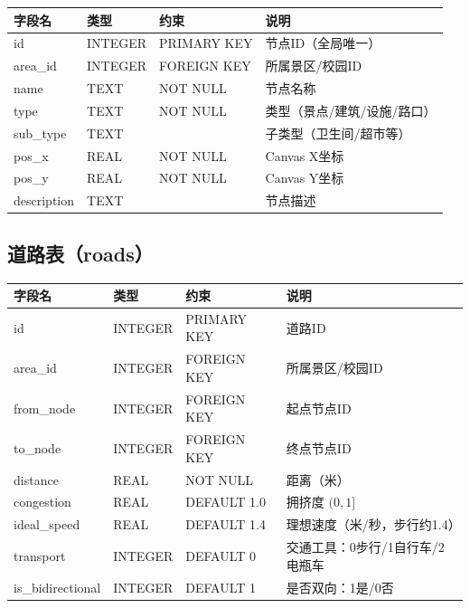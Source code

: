 \documentclass[12pt,a4paper]{report}
\begin{document}
\begin{table}[H]
\centering
\small
\begin{tabular}{llll}
\toprule
\textbf{字段名} & \textbf{类型} & \textbf{约束} & \textbf{说明} \\
\midrule
id & INTEGER & PRIMARY KEY & 节点ID（全局唯一） \\
area\_id & INTEGER & FOREIGN KEY & 所属景区/校园ID \\
name & TEXT & NOT NULL & 节点名称 \\
type & TEXT & NOT NULL & 类型（景点/建筑/设施/路口） \\
sub\_type & TEXT & & 子类型（卫生间/超市等） \\
pos\_x & REAL & NOT NULL & Canvas X坐标 \\
pos\_y & REAL & NOT NULL & Canvas Y坐标 \\
description & TEXT & & 节点描述 \\
\bottomrule
\end{tabular}
\end{table}

\subsection{道路表（roads）}

\begin{table}[H]
\centering
\small
\begin{tabular}{llll}
\toprule
\textbf{字段名} & \textbf{类型} & \textbf{约束} & \textbf{说明} \\
\midrule
id & INTEGER & PRIMARY KEY & 道路ID \\
area\_id & INTEGER & FOREIGN KEY & 所属景区/校园ID \\
from\_node & INTEGER & FOREIGN KEY & 起点节点ID \\
to\_node & INTEGER & FOREIGN KEY & 终点节点ID \\
distance & REAL & NOT NULL & 距离（米） \\
congestion & REAL & DEFAULT 1.0 & 拥挤度 $(0, 1]$ \\
ideal\_speed & REAL & DEFAULT 1.4 & 理想速度（米/秒，步行约1.4） \\
transport & INTEGER & DEFAULT 0 & 交通工具：0步行/1自行车/2电瓶车 \\
is\_bidirectional & INTEGER & DEFAULT 1 & 是否双向：1是/0否 \\
\bottomrule
\end{tabular}
\end{table}
\end{document}
